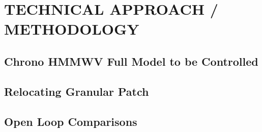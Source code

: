 \documentclass[12pt,twocolumn]{article}
\begin{document}


\section{TECHNICAL APPROACH / METHODOLOGY}\label{s:methodology}

\subsection{Chrono HMMWV Full Model to be Controlled }\label{ss:MPC}


\subsection{Relocating Granular Patch }\label{ss:Patch}


\subsection{Open Loop Comparisons }\label{ss:OpenLoop}
\end{document}
